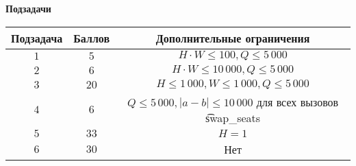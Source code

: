 \bf{Подзадачи}

\begin{tabular}{|c|c|c|}\hline
\bf{Подзадача}&\bf{Баллов}&\bf{Дополнительные ограничения}\\\hline
 $ 1 $ & $ 5 $ & $ H \cdot W \le 100, Q \le 5\,000 $ \\\hline
 $ 2 $ & $ 6 $ & $ H \cdot W \le 10\,000, Q \le 5\,000 $ \\\hline
 $ 3 $ & $ 20 $ & $ H \le 1\,000, W \le 1\,000, Q \le 5\,000 $ \\\hline
 $ 4 $ & $ 6 $ & $ Q \le 5\,000, |a-b| \le 10\,000 $ для всех вызовов \t{swap_seats}\\\hline
 $ 5 $ & $ 33 $ & $ H=1 $ \\\hline
 $ 6 $ & $ 30 $ &Нет\\\hline
\end{tabular}